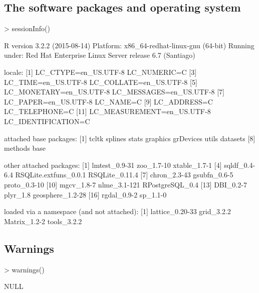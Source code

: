 \documentclass[a4paper]{article}                %
\begin{document}
\subsection{The software packages and operating system}
\begin{Schunk}
\begin{Sinput}
> sessionInfo()
\end{Sinput}
\begin{Soutput}
R version 3.2.2 (2015-08-14)
Platform: x86_64-redhat-linux-gnu (64-bit)
Running under: Red Hat Enterprise Linux Server release 6.7 (Santiago)

locale:
 [1] LC_CTYPE=en_US.UTF-8       LC_NUMERIC=C              
 [3] LC_TIME=en_US.UTF-8        LC_COLLATE=en_US.UTF-8    
 [5] LC_MONETARY=en_US.UTF-8    LC_MESSAGES=en_US.UTF-8   
 [7] LC_PAPER=en_US.UTF-8       LC_NAME=C                 
 [9] LC_ADDRESS=C               LC_TELEPHONE=C            
[11] LC_MEASUREMENT=en_US.UTF-8 LC_IDENTIFICATION=C       

attached base packages:
[1] tcltk     splines   stats     graphics  grDevices utils     datasets 
[8] methods   base     

other attached packages:
 [1] lmtest_0.9-31         zoo_1.7-10            xtable_1.7-1         
 [4] sqldf_0.4-6.4         RSQLite.extfuns_0.0.1 RSQLite_0.11.4       
 [7] chron_2.3-43          gsubfn_0.6-5          proto_0.3-10         
[10] mgcv_1.8-7            nlme_3.1-121          RPostgreSQL_0.4      
[13] DBI_0.2-7             plyr_1.8              geosphere_1.2-28     
[16] rgdal_0.9-2           sp_1.1-0             

loaded via a namespace (and not attached):
[1] lattice_0.20-33 grid_3.2.2      Matrix_1.2-2    tools_3.2.2    
\end{Soutput}
\end{Schunk}

\subsection{Warnings}
\begin{Schunk}
\begin{Sinput}
> warnings()
\end{Sinput}
\begin{Soutput}
NULL
\end{Soutput}
\end{Schunk}
\end{document}
